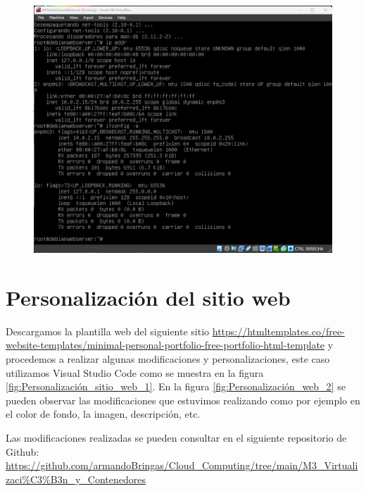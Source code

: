 \documentclass[12pt,a4paper]{article}
\begin{document}
\begin{figure}[H]
    \centering
    \includegraphics[width=1\linewidth]{M3_Virtualización_y_Contenedores/Tarea_2_Máquina_Virtual_Local/reporte/figuras/4-2_Configuración_servicios.png}
    \label{fig:Configuración_serivicios_2}
\end{figure}


\section{Personalización del sitio web}


Descargamos la plantilla web del siguiente sitio \url{ https://htmltemplates.co/free-website-templates/minimal-personal-portfolio-free-portfolio-html-template} y procedemos a realizar algunas modificaciones y personalizaciones, este caso utilizamos Visual Studio Code como se muestra en la figura \ref{fig:Personalización_sitio_web_1}. En la figura \ref{fig:Personalización_web_2} se pueden observar las modificaciones que estuvimos realizando como por ejemplo en el color de fondo, la imagen, descripción, etc. 

Las modificaciones realizadas se pueden consultar en el siguiente repositorio de Github:
\url{https://github.com/armandoBringas/Cloud_Computing/tree/main/M3_Virtualizaci%C3%B3n_y_Contenedores}
\end{document}
